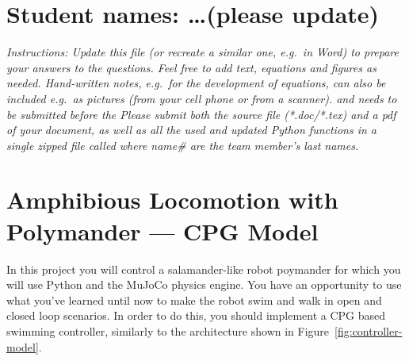 \documentclass{cmc}
\begin{document}
\pagestyle{fancy}
 

\section*{Student names: \ldots (please update)}

\textit{Instructions: Update this file (or recreate a similar one, e.g.\ in
  Word) to prepare your answers to the questions. Feel free to add text,
  equations and figures as needed. Hand-written notes, e.g.\ for the development
  of equations, can also be included e.g.\ as pictures (from your cell phone or
  from a scanner).  \textbf{} and needs to be
  submitted before the \textbf{}  Please submit both the source file
  (*.doc/*.tex) and a pdf of your document, as well as all the used and updated
  Python functions in a single zipped file called
   where name\# are the team
  member's last names.  }
\\

\section*{Amphibious Locomotion with Polymander --- CPG Model}\label{sec:exploring-swimming}

In this project you will control a salamander-like robot poymander
 for which you will use Python and the MuJoCo physics
engine. You have an opportunity to use what you've learned until
now to make the robot swim and walk in open and closed loop scenarios.
In order to do this, you should implement a CPG based swimming controller,
similarly to the architecture shown in Figure~\ref{fig:controller-model}.
\end{document}
